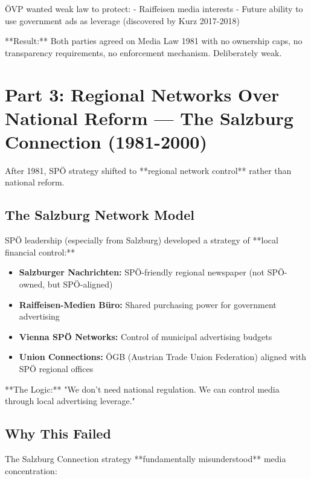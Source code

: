 ÖVP wanted weak law to protect:
- Raiffeisen media interests
- Future ability to use government ads as leverage (discovered by Kurz 2017-2018)

**Result:** Both parties agreed on Media Law 1981 with no ownership caps, no transparency requirements,
no enforcement mechanism. Deliberately weak.


\section*{Part 3: Regional Networks Over National Reform --- The Salzburg Connection (1981-2000)}

After 1981, SPÖ strategy shifted to **regional network control** rather than national reform.

\subsection*{The Salzburg Network Model}

SPÖ leadership (especially from Salzburg) developed a strategy of **local financial control:**

\begin{itemize}
\item \textbf{Salzburger Nachrichten:} SPÖ-friendly regional newspaper (not SPÖ-owned, but SPÖ-aligned)
\item \textbf{Raiffeisen-Medien Büro:} Shared purchasing power for government advertising
\item \textbf{Vienna SPÖ Networks:} Control of municipal advertising budgets
\item \textbf{Union Connections:} ÖGB (Austrian Trade Union Federation) aligned with SPÖ regional offices
\end{itemize}

**The Logic:** "We don't need national regulation. We can control media through local advertising leverage."

\subsection*{Why This Failed}

The Salzburg Connection strategy **fundamentally misunderstood** media concentration:

